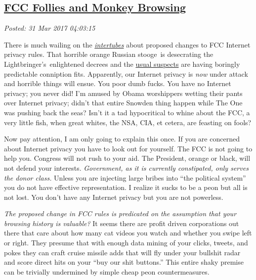 %

\subsection*{\href{https://analyzethedatanotthedrivel.org/2017/03/30/fcc-follies-and-monkey-browsing/}{FCC Follies and Monkey Browsing}}


\noindent\emph{Posted: 31 Mar 2017 04:03:15}
\vspace{6pt}

There is much wailing on the
\href{http://www.urbandictionary.com/define.php?term=intertubes}{\emph{intertubes}} about
proposed changes to FCC Internet privacy rules. That horrible orange
Russian stooge~is desecrating the Lightbringer's~enlightened decrees and
the
\href{https://www.washingtonpost.com/news/the-switch/wp/2017/03/28/republicans-are-poised-to-roll-back-landmark-fcc-privacy-rules-heres-what-you-need-to-know/}{usual
suspects} are having boringly predictable conniption fits. Apparently,
our Internet privacy is \emph{now} under attack and horrible things will
ensue. You poor dumb fucks. You have no Internet privacy; you never did!
I'm amused by Obama worshippers wetting their pants over Internet
privacy; didn't that entire Snowden thing happen while The One was
pushing back the seas? Isn't it a tad hypocritical to whine about the
FCC, a very little fish, when great whites, the NSA, CIA, et cetera, are
feasting on fools?

Now pay attention, I am only going to explain this once. If you are
concerned about Internet privacy you have to look out for yourself. The
FCC is not going to help you. Congress will not rush to your aid. The
President, orange or black, will not defend your interests.
\emph{Government, as it is currently constipated, only serves the donor
class.} Unless you are injecting large bribes into ``the political
system'' you do not have effective representation. I realize it sucks to
be a peon but all is not lost. You don't have any Internet privacy but
you are not powerless.

\emph{The proposed change in FCC rules is predicated on the assumption
that your browsing history is valuable?} It seems there are profit
driven corporations out there that care about how many cat videos you
watch and whether you swipe left or right. They presume that with enough
data mining of your clicks, tweets, and pokes they can craft cruise
missile adds that will fly under your bullshit radar and score direct
hits on your ``buy our shit buttons.'' This entire shaky premise can be
trivially undermined by simple cheap peon countermeasures.

